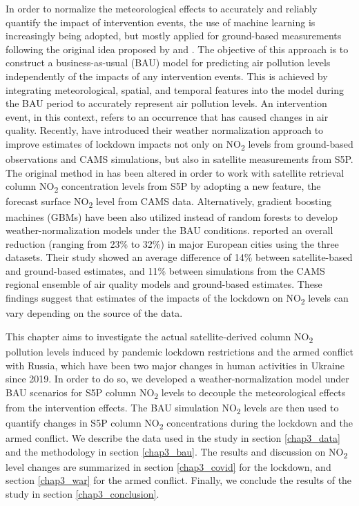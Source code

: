 In order to normalize the meteorological effects to accurately and reliably quantify the impact of intervention events, the use of machine learning is increasingly being adopted, but mostly applied for ground-based measurements following the original idea proposed by \citep{grange2018random} and \citep{grange2019using}. The objective of this approach is to construct a business-as-usual (BAU) model for predicting air pollution levels independently of the impacts of any intervention events. This is achieved by integrating meteorological, spatial, and temporal features into the model during the BAU period to accurately represent air pollution levels. An intervention event, in this context, refers to an occurrence that has caused changes in air quality. Recently, \citep{barre2021estimating} have introduced their weather normalization approach to improve estimates of lockdown impacts not only on NO\textsubscript{2} levels from ground-based observations and CAMS simulations, but also in satellite measurements from S5P. The original method in \citep{grange2018random,grange2019using} has been altered in order to work with satellite retrieval column NO\textsubscript{2} concentration levels from S5P by adopting a new feature, the forecast surface NO\textsubscript{2} level from CAMS data. Alternatively, gradient boosting machines (GBMs) \citep{friedman2001greedy} have been also utilized instead of random forests \citep{grange2018random} to develop weather-normalization models under the BAU conditions. \citep{barre2021estimating} reported an overall reduction (ranging from 23\% to 32\%) in major European cities using the three datasets. Their study showed an average difference of 14\% between satellite-based and ground-based estimates, and 11\% between simulations from the CAMS regional ensemble of air quality models and ground-based estimates. These findings suggest that estimates of the impacts of the lockdown on NO\textsubscript{2} levels can vary depending on the source of the data.\par
This chapter aims to investigate the actual satellite-derived column NO\textsubscript{2} pollution levels induced by pandemic lockdown restrictions and the armed conflict with Russia, which have been two major changes in human activities in Ukraine since 2019. In order to do so, we developed a weather-normalization model under BAU scenarios for S5P column NO\textsubscript{2} levels to decouple the meteorological effects from the intervention effects. The BAU simulation NO\textsubscript{2} levels are then used to quantify changes in S5P column NO\textsubscript{2} concentrations during the lockdown and the armed conflict. We describe the data used in the study in section \ref{chap3_data} and the methodology in section \ref{chap3_bau}. The results and discussion on NO\textsubscript{2} level changes are summarized in section \ref{chap3_covid} for the lockdown, and section \ref{chap3_war} for the armed conflict. Finally, we conclude the results of the study in section \ref{chap3_conclusion}.\par
